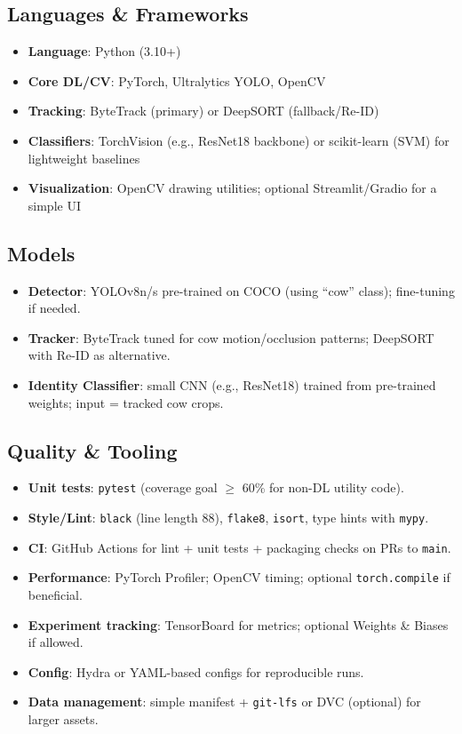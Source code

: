 \documentclass{article}
\begin{document}
\subsection*{Languages \& Frameworks}
\begin{itemize}
  \item \textbf{Language}: Python (3.10+)
  \item \textbf{Core DL/CV}: PyTorch, Ultralytics YOLO, OpenCV
  \item \textbf{Tracking}: ByteTrack (primary) or DeepSORT (fallback/Re-ID)
  \item \textbf{Classifiers}: TorchVision (e.g., ResNet18 backbone) or scikit-learn (SVM) for lightweight baselines
  \item \textbf{Visualization}: OpenCV drawing utilities; optional Streamlit/Gradio for a simple UI
\end{itemize}

\subsection*{Models}
\begin{itemize}
  \item \textbf{Detector}: YOLOv8n/s pre-trained on COCO (using ``cow'' class); fine-tuning if needed.
  \item \textbf{Tracker}: ByteTrack tuned for cow motion/occlusion patterns; DeepSORT with Re-ID as alternative.
  \item \textbf{Identity Classifier}: small CNN (e.g., ResNet18) trained from pre-trained weights; input = tracked cow crops.
\end{itemize}

\subsection*{Quality \& Tooling}
\begin{itemize}
  \item \textbf{Unit tests}: \texttt{pytest} (coverage goal $\geq$ 60\% for non-DL utility code).
  \item \textbf{Style/Lint}: \texttt{black} (line length 88), \texttt{flake8}, \texttt{isort}, type hints with \texttt{mypy}.
  \item \textbf{CI}: GitHub Actions for lint + unit tests + packaging checks on PRs to \texttt{main}.
  \item \textbf{Performance}: PyTorch Profiler; OpenCV timing; optional \texttt{torch.compile} if beneficial.
  \item \textbf{Experiment tracking}: TensorBoard for metrics; optional Weights \& Biases if allowed.
  \item \textbf{Config}: Hydra or YAML-based configs for reproducible runs.
  \item \textbf{Data management}: simple manifest + \texttt{git-lfs} or DVC (optional) for larger assets.
\end{itemize}
\end{document}
